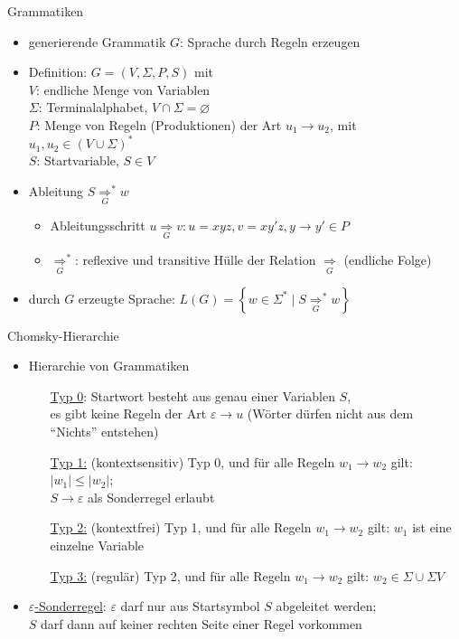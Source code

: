 \begin{frame}{Grammatiken}
	\begin{itemize}
		\item generierende Grammatik $G$: Sprache durch Regeln erzeugen
		\item Definition: $G=(V, \Sigma, P, S)$ mit\\
		$V$: endliche Menge von Variablen\\
		$\Sigma$: Terminalalphabet, $V \cap \Sigma = \varnothing$\\
		$P$: Menge von Regeln (Produktionen) der Art $u_1 \rightarrow u_2$, mit $u_1, u_2 \in \left(V \cup \Sigma\right)^*$\\
		$S$: Startvariable, $S \in V$
		\item Ableitung $S \underset{G}{\Rightarrow}^* w$
		\begin{itemize}
			\item Ableitungsschritt $u \underset{G}{\Rightarrow} v: u=xyz, v=xy'z, y\rightarrow y' \in P$
			\item $\underset{G}{\Rightarrow}^*$: reflexive und transitive Hülle der Relation $\underset{G}{\Rightarrow}$ (endliche Folge)
		\end{itemize}
		\item durch $G$ erzeugte Sprache: $L(G)=\left\{w \in \Sigma^* \mid S \underset{G}{\Rightarrow}^* w\right\}$
	\end{itemize}
\end{frame}

\begin{frame}{Chomsky-Hierarchie}
	\begin{itemize}
		\item Hierarchie von Grammatiken
		\begin{itemize}
			\item[\underline{Typ 0}:] Startwort besteht aus genau einer Variablen $S$,\\
			es gibt keine Regeln der Art $\varepsilon \rightarrow u$ (Wörter dürfen nicht aus dem "`Nichts"' entstehen)
			\item[\underline{Typ 1:}] (kontextsensitiv) Typ 0, und für alle Regeln $w_1 \rightarrow w_2$ gilt: $|w_1| \leq |w_2|$;\\
			$S \rightarrow \varepsilon$ als Sonderregel erlaubt
			\item[\underline{Typ 2:}] (kontextfrei) Typ 1, und für alle Regeln $w_1 \rightarrow w_2$ gilt: $w_1$ ist eine einzelne Variable
			\item[\underline{Typ 3:}] (regulär) Typ 2, und für alle Regeln $w_1 \rightarrow w_2$ gilt: $w_2 \in \Sigma \cup \Sigma V$
		\end{itemize}
		\item \underline{$\varepsilon$-Sonderregel}: $\varepsilon$ darf nur aus Startsymbol $S$ abgeleitet werden;\\$S$ darf dann auf keiner rechten Seite einer Regel vorkommen
	\end{itemize}
\end{frame}

